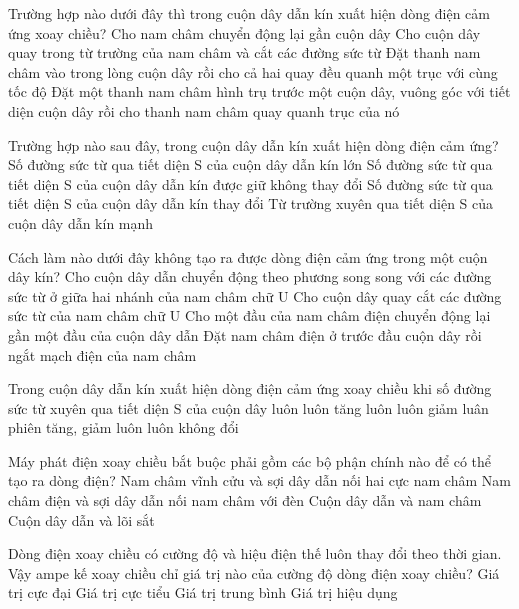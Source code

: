 


\begin{ex}
	Trường hợp nào dưới đây thì trong cuộn dây dẫn kín xuất hiện dòng điện cảm ứng xoay chiều?
	\choice
	{\True Cho nam châm chuyển động lại gần cuộn dây}
	{Cho cuộn dây quay trong từ trường của nam châm và cắt các đường sức từ}
	{Đặt thanh nam châm vào trong lòng cuộn dây rồi cho cả hai quay đều quanh một trục với cùng tốc độ}
	{Đặt một thanh nam châm hình trụ trước một cuộn dây, vuông góc với tiết diện cuộn dây rồi cho thanh nam châm quay quanh trục của nó}
	\loigiai{}
\end{ex}


\begin{ex}
	Trường hợp nào sau đây, trong cuộn dây dẫn kín xuất hiện dòng điện cảm ứng?
	\choice
	{Số đường sức từ qua tiết diện S của cuộn dây dẫn kín lớn}
	{Số đường sức từ qua tiết diện S của cuộn dây dẫn kín được giữ không thay đổi}
	{\True Số đường sức từ qua tiết diện S của cuộn dây dẫn kín thay đổi}
	{Từ trường xuyên qua tiết diện S của cuộn dây dẫn kín mạnh}
	\loigiai{}
\end{ex}
\begin{ex}
	Cách làm nào dưới đây không tạo ra được dòng điện cảm ứng trong một cuộn dây kín?
	\choice
	{\True Cho cuộn dây dẫn chuyển động theo phương song song với các đường sức từ ở giữa hai nhánh của nam châm chữ U}
	{Cho cuộn dây quay cắt các đường sức từ của nam châm chữ U}
	{Cho một đầu của nam châm điện chuyển động lại gần một đầu của cuộn dây dẫn}
	{Đặt nam châm điện ở trước đầu cuộn dây rồi ngắt mạch điện của nam châm}
	\loigiai{}
\end{ex}
\begin{ex}
	Trong cuộn dây dẫn kín xuất hiện dòng điện cảm ứng xoay chiều khi số đường sức từ xuyên qua tiết diện S của cuộn dây
	\choice
	{luôn luôn tăng}
	{luôn luôn giảm}
	{\True luân phiên tăng, giảm}
	{luôn luôn không đổi}
	\loigiai{}
\end{ex}
\begin{ex}
	Máy phát điện xoay chiều bắt buộc phải gồm các bộ phận chính nào để có thể tạo ra dòng điện?
	\choice
	{Nam châm vĩnh cửu và sợi dây dẫn nối hai cực nam châm}
	{Nam châm điện và sợi dây dẫn nối nam châm với đèn}
	{\True Cuộn dây dẫn và nam châm}
	{Cuộn dây dẫn và lõi sắt}
	\loigiai{}
\end{ex}
\begin{ex}
	Dòng điện xoay chiều có cường độ và hiệu điện thế luôn thay đổi theo thời gian. Vậy ampe kế xoay chiều chỉ giá trị nào của cường độ dòng điện xoay chiều?
	\choice
	{Giá trị cực đại}
	{Giá trị cực tiểu}
	{Giá trị trung bình}
	{\True Giá trị hiệu dụng}
	\loigiai{}
\end{ex}

